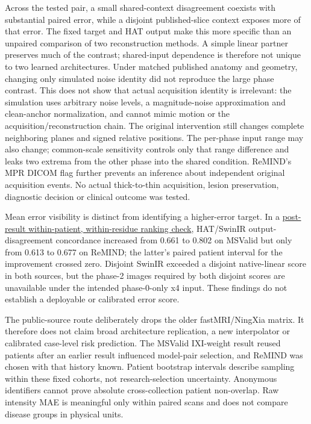 \documentclass[
]{article}
\begin{document}
Across the tested pair, a small shared-context disagreement coexists
with substantial paired error, while a disjoint published-slice context
exposes more of that error. The fixed target and HAT output make this
more specific than an unpaired comparison of two reconstruction methods.
A simple linear partner preserves much of the contrast; shared-input
dependence is therefore not unique to two learned architectures. Under
matched published anatomy and geometry, changing only simulated noise
identity did not reproduce the large phase contrast. This does not show
that actual acquisition identity is irrelevant: the simulation uses
arbitrary noise levels, a magnitude-noise approximation and clean-anchor
normalization, and cannot mimic motion or the acquisition/reconstruction
chain. The original intervention still changes complete neighboring
planes and signed relative positions. The per-phase input range may also
change; common-scale sensitivity controls only that range difference and
leaks two extrema from the other phase into the shared condition.
ReMIND's MPR DICOM flag further prevents an inference about independent
original acquisition events. No actual thick-to-thin acquisition, lesion
preservation, diagnostic decision or clinical outcome was tested.

Mean error visibility is distinct from identifying a higher-error
target. In a
\href{TWO_SOURCE_TARGET_ERROR_RANKING_RESULT_2026-10-01.md}{post-result
within-patient, within-residue ranking check}, HAT/SwinIR
output-disagreement concordance increased from 0.661 to 0.802 on MSValid
but only from 0.613 to 0.677 on ReMIND; the latter's paired patient
interval for the improvement crossed zero. Disjoint SwinIR exceeded a
disjoint native-linear score in both sources, but the phase-2 images
required by both disjoint scores are unavailable under the intended
phase-0-only x4 input. These findings do not establish a deployable or
calibrated error score.

The public-source route deliberately drops the older fastMRI/NingXia
matrix. It therefore does not claim broad architecture replication, a
new interpolator or calibrated case-level risk prediction. The MSValid
IXI-weight result reused patients after an earlier result influenced
model-pair selection, and ReMIND was chosen with that history known.
Patient bootstrap intervals describe sampling within these fixed
cohorts, not research-selection uncertainty. Anonymous identifiers
cannot prove absolute cross-collection patient non-overlap. Raw
intensity MAE is meaningful only within paired scans and does not
compare disease groups in physical units.
\end{document}
